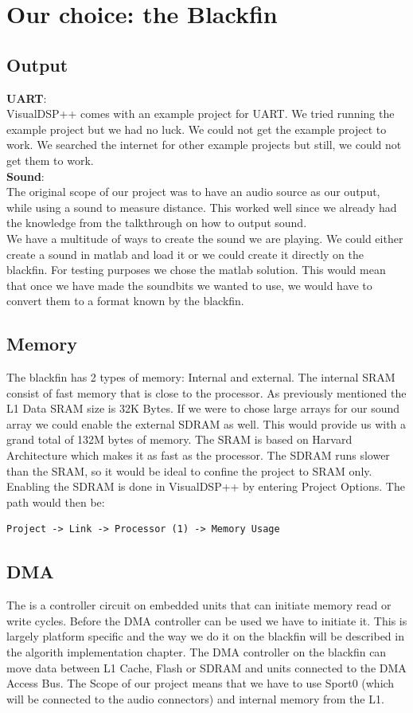 \section{Our choice: the Blackfin}
\subsection{Output}
\textbf{UART}:\\
VisualDSP++ comes with an example project for UART. We tried running the example project but we had no luck. We could not get the example project to work. We searched the internet for other example projects but still, we could not get them to work. \\
\textbf{Sound}:\\
The original scope of our project was to have an audio source as our output, while using a sound to measure distance. This worked well since we already had the knowledge from the talkthrough on how to output sound.\\
We have a multitude of ways to create the sound we are playing. We could either create a sound in matlab and load it or we could create it directly on the blackfin. For testing purposes we chose the matlab solution. This would mean that once we have made the soundbits we wanted to use, we would have to convert them to a format known by the blackfin.
\subsection{Memory}
The blackfin has 2 types of memory: Internal and external. The internal SRAM consist of fast memory that is close to the processor.  As previously mentioned the L1 Data SRAM size is 32K Bytes. If we were to chose large arrays for our sound array we could enable the external SDRAM as well. This would provide us with a grand total of 132M bytes of memory. The SRAM is based on Harvard Architecture which makes it as fast as the processor. The SDRAM runs slower than the SRAM, so it would be ideal to confine the project to SRAM only. Enabling the SDRAM is done in VisualDSP++ by entering Project Options. The path would then be:
\begin{verbatim}
Project -> Link -> Processor (1) -> Memory Usage
\end{verbatim}

\subsection{DMA}
The is a controller circuit on embedded units that can initiate memory read or write cycles. Before the DMA controller can be used we have to initiate it. This is largely platform specific and the way we do it on the blackfin will be described in the algorith implementation chapter. The DMA controller on the blackfin can move data between L1 Cache, Flash or SDRAM and units connected to the DMA Access Bus. The Scope of our project means that we have to use Sport0 (which will be connected to the audio connectors) and internal memory from the L1. \\

